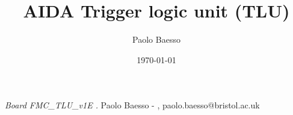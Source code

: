 \documentclass[10pt,twoside, fleqn]{memoir}
\author{Paolo Baesso}
\title{AIDA Trigger logic unit (TLU)}
\date{\today}
\makeatletter
\def\maketitle{%
  \null
  \thispagestyle{empty}%
  \vfill
  \begin{center}\leavevmode
    \normalfont
    {\LARGE\raggedleft \@author\par}%
    \hrulefill\par
    {\huge\raggedright \@title\par}%
    \vskip 1cm
  {\Large \@date\par}%
  \end{center}%
  \vfill
  \null
  \cleardoublepage
  }
\makeatother
\begin{document}
\def\brd{FMC\_TLU\_v1E }
\def\oldbrd{FMC\_TLU\_v1C }

\let\cleardoublepage\clearpage


\maketitle
\frontmatter

\null\vfill
\begin{flushleft}
\textit{Board \brd.}\newline
\newline
Paolo Baesso - \monthname,   \the\year\newline paolo.baesso@bristol.ac.uk
\bigskip

\end{flushleft}
\let\cleardoublepage\clearpage

\newpage
\tableofcontents

\mainmatter
\sloppy

\newenvironment{SpecialPar}
  {\begin{shaded}\noindent}
  {\end{shaded}}




%

















%


\printglossaries
\printglossary[type=\acronymtype,title=Abbreviations]

%
%
\end{document}
